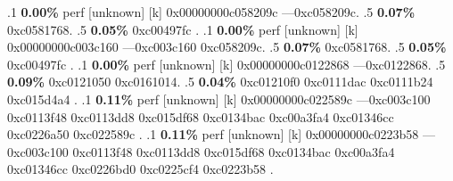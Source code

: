 \begin{profile}
{.1 \textbf{ 0.00\%} perf             [unknown]              [k] 0x00000000c058209c\newline {} ---0xc058209c. 
.5 \textbf{0.07\%} 0xc0581768. 
.5 \textbf{0.05\%} 0xc00497fc\newline {} . 
.1 \textbf{ 0.00\%} perf             [unknown]              [k] 0x00000000c003c160\newline {} ---0xc003c160\newline {} 0xc058209c. 
.5 \textbf{0.07\%} 0xc0581768. 
.5 \textbf{0.05\%} 0xc00497fc\newline {} . 
.1 \textbf{ 0.00\%} perf             [unknown]              [k] 0x00000000c0122868\newline {} ---0xc0122868. 
.5 \textbf{0.09\%} 0xc0121050\newline {} 0xc0161014. 
.5 \textbf{0.04\%} 0xc01210f0\newline {} 0xc0111dac\newline {} 0xc0111b24\newline {} 0xc015d4a4\newline {} . 
.1 \textbf{ 0.11\%} perf             [unknown]              [k] 0x00000000c022589c\newline {} ---0xc003c100\newline {} 0xc0113f48\newline {} 0xc0113dd8\newline {} 0xc015df68\newline {} 0xc0134bac\newline {} 0xc00a3fa4\newline {} 0xc01346cc\newline {} 0xc0226a50\newline {} 0xc022589c\newline {} . 
.1 \textbf{ 0.11\%} perf             [unknown]              [k] 0x00000000c0223b58\newline {} ---0xc003c100\newline {} 0xc0113f48\newline {} 0xc0113dd8\newline {} 0xc015df68\newline {} 0xc0134bac\newline {} 0xc00a3fa4\newline {} 0xc01346cc\newline {} 0xc0226bd0\newline {} 0xc0225cf4\newline {} 0xc0223b58\newline {} . 
}
\end{profile}
